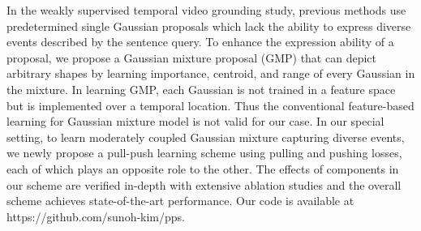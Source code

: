 In the weakly supervised temporal video grounding study, previous methods use predetermined single Gaussian proposals which lack the ability to express diverse events described by the sentence query. To enhance the expression ability of a proposal, we propose a Gaussian mixture proposal (GMP) that can depict arbitrary shapes by learning importance, centroid, and range of every Gaussian in the mixture. In learning GMP, each Gaussian is not trained in a feature space but is implemented over a temporal location. Thus the conventional feature-based learning for Gaussian mixture model is not valid for our case. In our special setting, to learn moderately coupled Gaussian mixture capturing diverse events, we newly propose a pull-push learning scheme using pulling and pushing losses, each of which plays an opposite role to the other. The effects of components in our scheme are verified in-depth with extensive ablation studies and the overall scheme achieves state-of-the-art performance.
Our code is available at {https://github.com/sunoh-kim/pps}.